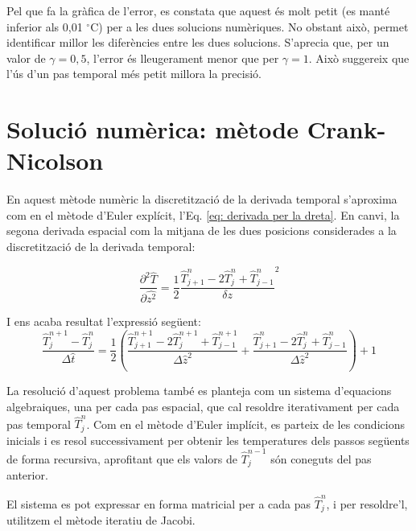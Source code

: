 \documentclass[11pt]{article}
\begin{document}
Pel que fa la gràfica de l'error, es constata que aquest és molt petit (es manté inferior als 0,01 $^\circ$C) per a les dues solucions numèriques. No obstant això, permet identificar millor les diferències entre les dues solucions. S'aprecia que, per un valor de $\gamma = 0,5$, l'error és lleugerament menor que per $\gamma = 1$. Això suggereix que l'ús d'un pas temporal més petit millora la precisió.


\section{Solució numèrica: mètode Crank-Nicolson}

En aquest mètode numèric la discretització de la derivada temporal s'aproxima com en el mètode d'Euler explícit, l'Eq. \eqref{eq: derivada per la dreta}. En canvi, la segona derivada espacial com la mitjana de les dues posicions considerades a la discretització de la derivada temporal:

\begin{equation}
    \frac{\partial^2\hat{T}}{\partial \hat{z^2}} = \frac{1}{2}\frac{\hat{T}_{j+1}^n-2\hat{T}_{j}^n+\hat{T}_{j-1}^n}{\delta z}^2
    \label{mitjana segones derivades espacials}
\end{equation}

I ens acaba resultat l'expressió següent:
\begin{equation}
    \frac{\hat{T}_j^{n+1}-\hat{T}_j^{n}}{\Delta\hat{t}} = {\frac{1}{2}}(\frac{\hat{T}_{j+1}^{n+1}-2\hat{T}_j^{n+1}+\hat{T}_{j-1}^{n+1}}{\Delta\hat{z}^2}+\frac{\hat{T}_{j+1}^{n}-2\hat{T}_j^{n}+\hat{T}_{j-1}^{n}}{\Delta\hat{z}^2}) + 1
    \label{discretitzacio crank-nicolson}
\end{equation}

La resolució d'aquest problema també es planteja com un sistema d'equacions algebraiques, una per cada pas espacial, que cal resoldre iterativament per cada pas temporal $\hat{T}_j^n$. Com en el mètode d'Euler implícit, es parteix de les condicions inicials i es resol successivament per obtenir les temperatures dels passos següents de forma recursiva, aprofitant que els valors de $\hat{T}_j^{n-1}$ són coneguts del pas anterior.

El sistema es pot expressar en forma matricial per a cada pas $\hat{T}_j^n$, i per resoldre'l, utilitzem el mètode iteratiu de Jacobi.
\end{document}
